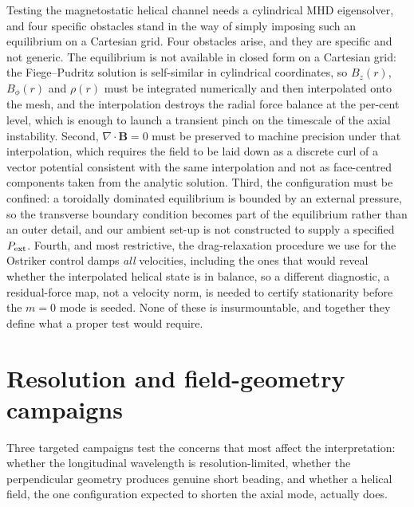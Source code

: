 \documentclass[usenatbib,twoside,twocolumn]{mnras}
\begin{document}
Testing the magnetostatic helical channel needs a cylindrical MHD eigensolver, and four specific obstacles stand in the way of simply imposing such an equilibrium on a Cartesian grid. Four obstacles arise, and they are specific and not generic. The equilibrium is not available in closed form on a Cartesian grid: the Fiege--Pudritz solution is self-similar in cylindrical coordinates, so $B_z(r)$, $B_\phi(r)$ and $\rho(r)$ must be integrated numerically and then interpolated onto the mesh, and the interpolation destroys the radial force balance at the per-cent level, which is enough to launch a transient pinch on the timescale of the axial instability. Second, $\nabla\!\cdot\!\mathbf{B}=0$ must be preserved to machine precision under that interpolation, which requires the field to be laid down as a discrete curl of a vector potential consistent with the same interpolation and not as face-centred components taken from the analytic solution. Third, the configuration must be confined: a toroidally dominated equilibrium is bounded by an external pressure, so the transverse boundary condition becomes part of the equilibrium rather than an outer detail, and our ambient set-up is not constructed to supply a specified $P_{\rm ext}$. Fourth, and most restrictive, the drag-relaxation procedure we use for the Ostriker control damps \emph{all} velocities, including the ones that would reveal whether the interpolated helical state is in balance, so a different diagnostic, a residual-force map, not a velocity norm, is needed to certify stationarity before the $m=0$ mode is seeded. None of these is insurmountable, and together they define what a proper test would require.


\section{Resolution and field-geometry campaigns}
\label{sec:optional_app}

Three targeted campaigns test the concerns that most affect the interpretation: whether the longitudinal wavelength is resolution-limited, whether the perpendicular geometry produces genuine short beading, and whether a helical field, the one configuration expected to shorten the axial mode, actually does.
\end{document}

